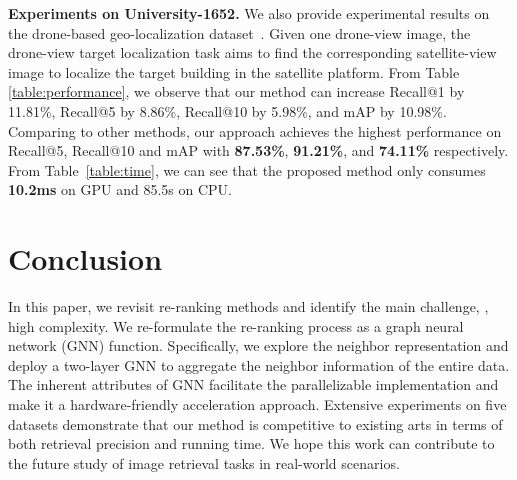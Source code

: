 \documentclass[10pt,twocolumn,letterpaper]{article}
\begin{document}
\noindent\textbf{Experiments on University-1652.}
We also provide experimental results on the drone-based geo-localization dataset~\cite{zheng2020university}. Given one drone-view image, the drone-view target localization task aims to find the corresponding satellite-view image to localize the target building in the satellite platform.
From Table \ref{table:performance}, we observe that our method can increase Recall@1 by 11.81\%, Recall@5 by 8.86\%, Recall@10 by 5.98\%, and mAP by 10.98\%. 
Comparing to other methods, our approach achieves the highest performance on Recall@5, Recall@10 and mAP with \textbf{87.53\%}, \textbf{91.21\%}, and \textbf{74.11\%}  respectively. From Table~\ref{table:time}, we can see that the proposed method only consumes \textbf{10.2ms} on GPU and 85.5s on CPU.


\section{Conclusion}
In this paper, we revisit re-ranking methods and identify the main challenge, \ie, high complexity. We re-formulate the re-ranking process as a graph neural network (GNN) function. Specifically, we explore the neighbor representation and deploy a two-layer GNN to aggregate the neighbor information of the entire data. The inherent attributes of GNN facilitate the parallelizable implementation and make it a hardware-friendly acceleration approach. 
Extensive experiments on five datasets demonstrate that our method is competitive to existing arts in terms of both retrieval precision and running time.
We hope this work can contribute to the future study of image retrieval tasks in real-world scenarios.







{\small


}
\end{document}
